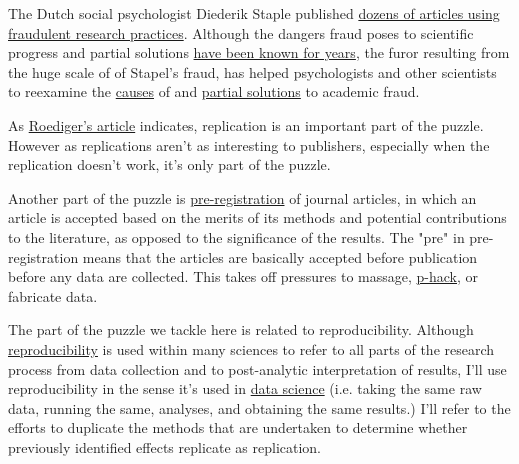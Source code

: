 \documentclass[12pt]{article}
\begin{document}
The Dutch social psychologist Diederik Staple published
\href{http://pubman.mpdl.mpg.de/pubman/item/escidoc:1569964:7/component/escidoc:1569966/Stapel_Investigation_Final_report.pdf}
{dozens of articles using fraudulent research practices}. Although the dangers fraud poses to scientific progress and partial solutions
\href{http://www.apa.org/monitor/feb02/fraud.aspx}{have been known for years}, the furor resulting from the huge scale of of Stapel's
fraud, has helped psychologists and other scientists to reexamine the 
\href{http://news.sciencemag.org/people-events/2012/11/final-report-stapel-affair-points-bigger-problems-social-psychology}{causes} of and \href{http://www.psychologicalscience.org/index.php/publications/observer/2012/february-12/psychologys-woes-and-a-partial-cure-the-value-of-replication.html}
{partial solutions} to academic fraud.

As \href{http://www.psychologicalscience.org/index.php/publications/observer/2012/february-12/psychologys-woes-and-a-partial-cure-the-value-of-replication.html}{Roediger's article} indicates, replication is an
important part of the puzzle. However as replications aren't as interesting to publishers, especially when
the replication doesn't work, it's only part of the puzzle.

Another part of the puzzle is
\href{http://www.theguardian.com/science/blog/2013/jun/05/trust-in-science-study-pre-registration}
{pre-registration} of journal articles, in which an article is accepted based on the merits of its
methods and potential contributions to the literature, as opposed to the significance of the results.
The "pre" in pre-registration means that the articles are basically accepted before publication before
any data are collected. This takes off pressures to massage,
\href{http://theness.com/neurologicablog/index.php/p-hacking-and-other-statistical-sins/}{p-hack}, or
fabricate data.

The part of the puzzle we tackle here is related to reproducibility. Although
\href{http://en.wikipedia.org/wiki/Reproducibility}{reproducibility} is used within many sciences to refer
to all parts of the research process from data collection and to post-analytic interpretation of results,
I'll use reproducibility in the sense it's used in
\href{http://www.computer.org/csdl/mags/cs/2009/01/mcs2009010028-abs.html}{data science} (i.e. taking the
same raw data, running the same, analyses, and obtaining the same results.) I'll refer to the efforts to
duplicate the methods that are undertaken to determine whether previously identified effects replicate as
replication.
\end{document}

